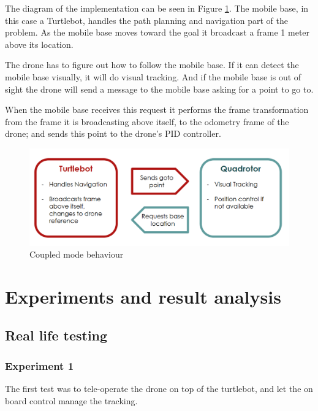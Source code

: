 \documentclass[11pt,a4paper]{article}
\begin{document}
The diagram of the implementation can be seen in Figure \ref{fig:coupled}. The mobile base, in this case a Turtlebot, handles the path planning and navigation part of the problem. As the mobile base moves toward the goal it broadcast a frame 1 meter above its location. 

The drone has to figure out how to follow the mobile base. If it can detect the mobile base visually, it will do visual tracking. And if the mobile base is out of sight the drone will send a message to the mobile base asking for a point to go to. 

When the mobile base receives this request it performs the frame transformation from the frame it is broadcasting above itself, to the odometry frame of the drone; and sends this point to the drone's PID controller.

\begin{figure}[ht]	
\centering
\includegraphics[width=12cm]{communication.png}
\caption{Coupled mode behaviour}
\label{fig:coupled}
\end{figure}




\section{Experiments and result analysis}
\subsection{Real life testing}
\subsubsection{Experiment 1}
The first test was to tele-operate the drone on top of the turtlebot, and let the on board control
manage the tracking.
\end{document}
